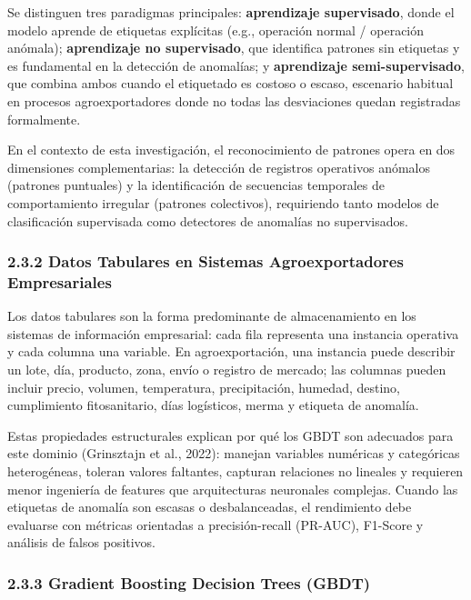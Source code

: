 Se distinguen tres paradigmas principales: \textbf{aprendizaje
supervisado}, donde el modelo aprende de etiquetas explícitas (e.g.,
operación normal / operación anómala); \textbf{aprendizaje no
supervisado}, que identifica patrones sin etiquetas y es fundamental en
la detección de anomalías; y \textbf{aprendizaje semi-supervisado}, que
combina ambos cuando el etiquetado es costoso o escaso, escenario
habitual en procesos agroexportadores donde no todas las desviaciones
quedan registradas formalmente.

En el contexto de esta investigación, el reconocimiento de patrones
opera en dos dimensiones complementarias: la detección de registros
operativos anómalos (patrones puntuales) y la identificación de
secuencias temporales de comportamiento irregular (patrones colectivos),
requiriendo tanto modelos de clasificación supervisada como detectores
de anomalías no supervisados.

\subsubsection{2.3.2 Datos Tabulares en Sistemas Agroexportadores
Empresariales}\label{datos-tabulares-en-sistemas-agroexportadores-empresariales}

Los datos tabulares son la forma predominante de almacenamiento en los
sistemas de información empresarial: cada fila representa una instancia
operativa y cada columna una variable. En agroexportación, una instancia
puede describir un lote, día, producto, zona, envío o registro de
mercado; las columnas pueden incluir precio, volumen, temperatura,
precipitación, humedad, destino, cumplimiento fitosanitario, días
logísticos, merma y etiqueta de anomalía.

Estas propiedades estructurales explican por qué los GBDT son adecuados
para este dominio (Grinsztajn et al., 2022): manejan variables numéricas
y categóricas heterogéneas, toleran valores faltantes, capturan
relaciones no lineales y requieren menor ingeniería de features que
arquitecturas neuronales complejas. Cuando las etiquetas de anomalía son
escasas o desbalanceadas, el rendimiento debe evaluarse con métricas
orientadas a precisión-recall (PR-AUC), F1-Score y análisis de falsos
positivos.

\subsubsection{2.3.3 Gradient Boosting Decision Trees
(GBDT)}\label{gradient-boosting-decision-trees-gbdt}

